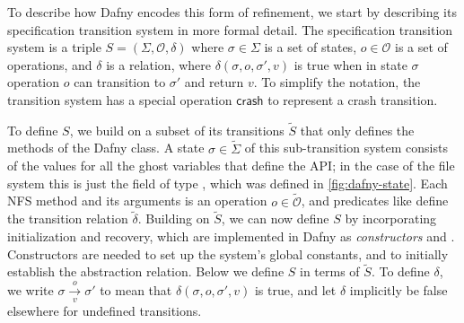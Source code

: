 \newcommand{\Op}{\mathcal{O}}

To describe how Dafny encodes this form of refinement, we start by describing its
specification transition system in more formal detail. The specification
transition system is
a triple $S = (\Sigma, \Op, \delta)$ where $\sigma \in \Sigma$ is a set of states,
$o \in \Op$ is a set of operations, and $\delta$ is a relation, where
$\delta(\sigma, o, \sigma', v)$ is true when in state $\sigma$ operation $o$ can
transition to $\sigma'$ and return $v$. To simplify the notation, the transition
system has a special operation $\mathsf{crash}$ to represent a crash transition.

\newcommand{\altsys}[1]{\tilde{#1}}

To define $S$, we build on a subset of its transitions $\altsys{S}$ that only
defines the methods of the Dafny class.
A state $\sigma \in \altsys{\Sigma}$ of this sub-transition system
consists of the values for all the ghost variables that define the API; in the
case of the file system this is just the  field of type
, which was defined in \cref{fig:dafny-state}. Each NFS method and its
arguments is an operation $o \in \altsys{\Op}$, and predicates like 
define the transition relation $\altsys{\delta}$. Building on $\altsys{S}$, we
can now define $S$ by incorporating
initialization and recovery, which are implemented
in Dafny as \emph{constructors}  and . Constructors are
needed to set up the system's global constants, and to initially establish the
abstraction relation. Below we define $S$ in terms of $\altsys{S}$.
To define $\delta$, we write $\sigma \xrightarrow[v]{o} \sigma'$ to mean that
$\delta(\sigma, o, \sigma', v)$ is true, and let $\delta$ implicitly be false
elsewhere for undefined transitions.

